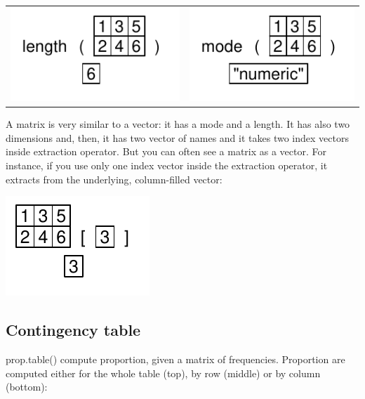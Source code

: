 \documentclass[pdflatex]{article}
\begin{document}
\begin{tabular}{cc}
\includegraphics{length_matrix.pdf} & \includegraphics{mode_matrix.pdf}
\end{tabular}

A matrix is very similar to a vector: it has a mode and a length. It has also
two dimensions and, then, it has two vector of names and it takes two index
vectors inside extraction operator. But you can often see a matrix as a vector.
For instance, if you use only one index vector inside the extraction operator,
it extracts from the underlying, column-filled vector:

\includegraphics{matrix_extraction_as_vector}

\subsection{Contingency table}

prop.table() compute proportion, given a matrix of frequencies. Proportion are computed either for the whole table (top), by row (middle) or by column (bottom):
\end{document}
